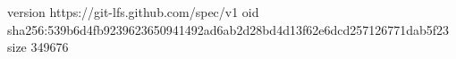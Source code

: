 version https://git-lfs.github.com/spec/v1
oid sha256:539b6d4fb9239623650941492ad6ab2d28bd4d13f62e6dcd257126771dab5f23
size 349676
